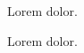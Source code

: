 \documentclass{article}
\begin{document}
\clozesetoption[margin]{2cm}
Lorem  dolor.

\clozereset

Lorem  dolor.
\end{document}
